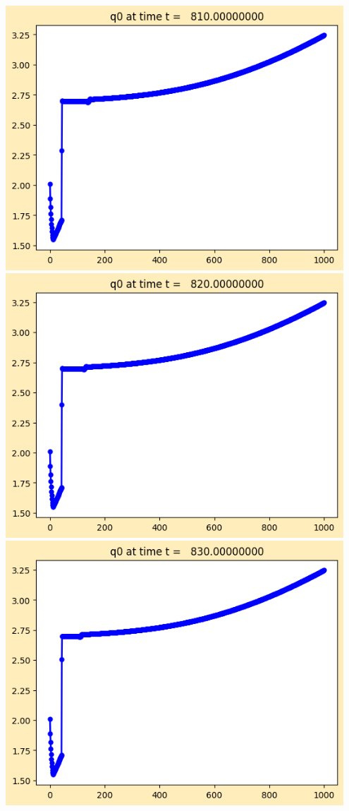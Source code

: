 \documentclass[11pt]{article}
\begin{document}
\vskip 10pt 
\includegraphics[width=0.95\textwidth]{frame0081fig1.png}
\vskip 10pt 
\includegraphics[width=0.95\textwidth]{frame0082fig1.png}
\vskip 10pt 
\includegraphics[width=0.95\textwidth]{frame0083fig1.png}
\end{document}
